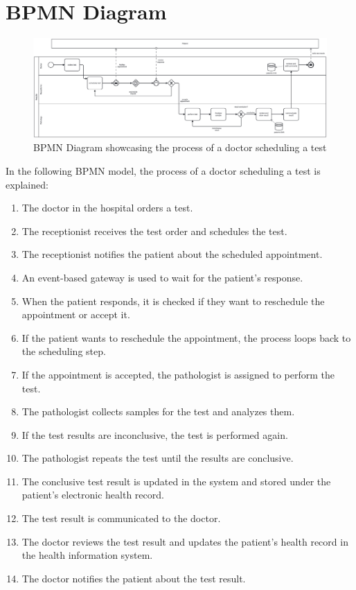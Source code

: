 \section{BPMN Diagram}

\begin{figure}[!htb]
\begin{center}\includegraphics[width=20cm,angle=90]{src/listings/BPMN/lab_bmpn.png}\end{center}
\caption{BPMN Diagram showcasing the process of a doctor scheduling a test}
\label{bpmn}
\end{figure}

In the following BPMN model, the process of a doctor scheduling a test is explained:

\begin{enumerate}
\item The doctor in the hospital orders a test.
\item The receptionist receives the test order and schedules the test.
\item The receptionist notifies the patient about the scheduled appointment.
\item An event-based gateway is used to wait for the patient's response.
\item When the patient responds, it is checked if they want to reschedule the appointment or accept it.
\item If the patient wants to reschedule the appointment, the process loops back to the scheduling step.
\item If the appointment is accepted, the pathologist is assigned to perform the test.
\item The pathologist collects samples for the test and analyzes them.
\item If the test results are inconclusive, the test is performed again.
\item The pathologist repeats the test until the results are conclusive.
\item The conclusive test result is updated in the system and stored under the patient's electronic health record.
\item The test result is communicated to the doctor.
\item The doctor reviews the test result and updates the patient's health record in the health information system.
\item The doctor notifies the patient about the test result.
\end{enumerate}

\let\cleardoublepage\clearpage
